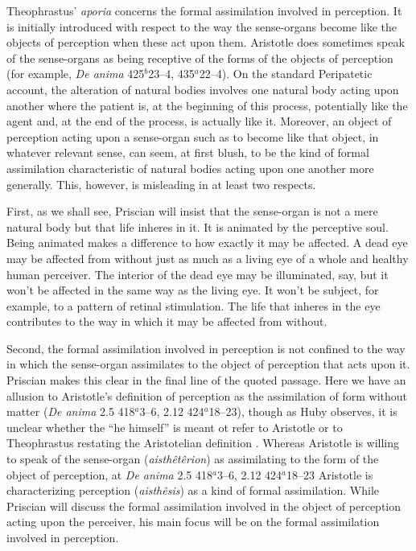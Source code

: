 \documentclass[12pt]{article}
\begin{document}
Theophrastus' \emph{aporia} concerns the formal assimilation involved in perception. It is initially introduced with respect to the way the sense-organs become like the objects of perception when these act upon them. Aristotle does sometimes speak of the sense-organs as being receptive of the forms of the objects of perception (for example, \emph{De anima} 425\( ^{b} \)23--4, 435\( ^{a} \)22--4). On the standard Peripatetic account, the alteration of natural bodies involves one natural body acting upon another where the patient is, at the beginning of this process, potentially like the agent and, at the end of the process, is actually like it. Moreover, an object of perception acting upon a sense-organ such as to become like that object, in whatever relevant sense, can seem, at first blush, to be the kind of formal assimilation characteristic of natural bodies acting upon one another more generally. This, however, is misleading in at least two respects. 

First, as we shall see, Priscian will insist that the sense-organ is not a mere natural body but that life inheres in it. It is animated by the perceptive soul. Being animated makes a difference to how exactly it may be affected. A dead eye may be affected from without just as much as a living eye of a whole and healthy human perceiver. The interior of the dead eye may be illuminated, say, but it won't be affected in the same way as the living eye. It won't be subject, for example, to a pattern of retinal stimulation. The life that inheres in the eye contributes to the way in which it may be affected from without.

Second, the formal assimilation involved in perception is not confined to the way in which the sense-organ assimilates to the object of perception that acts upon it. Priscian makes this clear in the final line of the quoted passage. Here we have an allusion to Aristotle's definition of perception as the assimilation of form without matter (\emph{De anima} 2.5 418\( ^{a} \)3--6, 2.12 424\( ^{a} \)18--23), though as Huby observes, it is unclear whether the ``he himself'' is meant ot refer to Aristotle or to Theophrastus restating the Aristotelian definition \citep[49--50 n11]{Sorabji:1997ly}. Whereas Aristotle is willing to speak of the sense-organ (\emph{aisthêtêrion}) as assimilating to the form of the object of perception, at \emph{De anima} 2.5 418\( ^{a} \)3--6, 2.12 424\( ^{a} \)18--23 Aristotle is characterizing perception (\emph{aisthêsis}) as a kind of formal assimilation. While Priscian will discuss the formal assimilation involved in the object of perception acting upon the perceiver, his main focus will be on the formal assimilation involved in perception.
\end{document}
